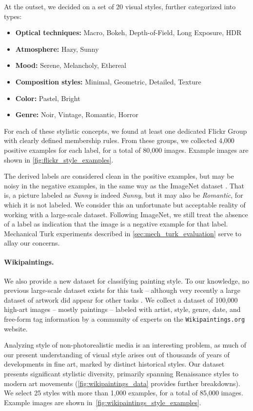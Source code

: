 At the outset, we decided on a set of 20 visual styles, further categorized into types:
\begin{itemize}
\item \textbf{Optical techniques:} Macro, Bokeh, Depth-of-Field, Long Exposure, HDR
\item \textbf{Atmosphere:} Hazy, Sunny
\item \textbf{Mood:} Serene, Melancholy, Ethereal
\item \textbf{Composition styles:} Minimal, Geometric, Detailed, Texture
\item \textbf{Color:} Pastel, Bright
\item \textbf{Genre:} Noir, Vintage, Romantic, Horror
\end{itemize}

For each of these stylistic concepts, we found at least one dedicated Flickr Group with clearly defined membership rules.
From these groups, we collected 4,000 positive examples for each label, for a total of 80,000 images.
Example images are shown in \autoref{fig:flickr_style_examples}.

The derived labels are considered clean in the positive examples, but may be noisy in the negative examples, in the same way as the ImageNet dataset \parencite{Deng-CVPR-2009}.
That is, a picture labeled as \emph{Sunny} is indeed \emph{Sunny}, but it may also be \emph{Romantic}, for which it is not labeled.
We consider this an unfortunate but acceptable reality of working with a large-scale dataset.
Following ImageNet, we still treat the absence of a label as indication that the image is a negative example for that label.
Mechanical Turk experiments described in \autoref{sec:mech_turk_evaluation} serve to allay our concerns.

\paragraph{Wikipaintings.}
We also provide a new dataset for classifying painting style.
To our knowledge, no previous large-scale dataset exists for this task -- although very recently a large dataset of artwork did appear for other tasks \parencite{Mensink2014}.
We collect a dataset of 100,000 high-art images -- mostly paintings -- labeled with artist, style, genre, date, and free-form tag information by a community of experts on the \texttt{Wikipaintings.org} website.

Analyzing style of non-photorealistic media is an interesting problem, as much of our present understanding of visual style arises out of thousands of years of developments in fine art, marked by distinct historical styles.
Our dataset presents significant stylistic diversity, primarily spanning Renaissance styles to modern art movements (\autoref{fig:wikipaintings_data} provides further breakdowns).
We select 25 styles with more than 1,000 examples, for a total of 85,000 images.
Example images are shown in~\autoref{fig:wikipaintings_style_examples}.

